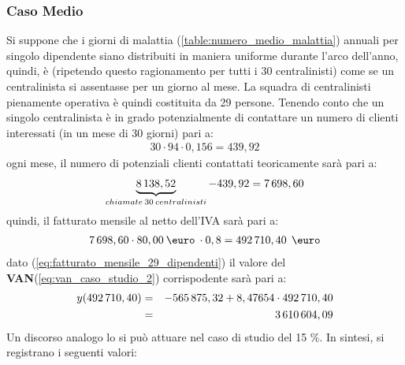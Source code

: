 \subsubsection[Caso Medio]{Caso Medio}
Si suppone che i giorni di malattia (\ref{table:numero_medio_malattia}) annuali per singolo dipendente siano distribuiti in maniera uniforme durante l'arco dell'anno, quindi, è (ripetendo questo ragionamento per tutti i 30 centralinisti) come se un centralinista si assentasse per un giorno al mese. \newline
La squadra di centralinisti pienamente operativa è quindi costituita da 29 persone. \newline
Tenendo conto che un singolo centralinista è in grado potenzialmente di contattare un numero di clienti interessati (in un mese di 30 giorni) pari a:
	\begin{equation}
	\label{eq:chiamate_1_dipendente}
	\begin{split}
		30 \cdot 94 \cdot 0,156 = 439,92
	\end{split}
	\end{equation}
ogni mese, il numero di potenziali clienti contattati teoricamente sarà pari a:
	\begin{equation}
	\label{eq:chiamate_29_dipendenti}
	\begin{split}
		\underbrace{8\thinspace 138,52}_{chiamate\: 30 \: centralinisti} - 439,92 = 7\thinspace 698,60
 	\end{split}
	\end{equation}
quindi, il fatturato mensile al netto dell'IVA sarà pari a:
	\begin{equation}
	\label{eq:fatturato_mensile_29_dipendenti}
	\begin{split}
		7\thinspace 698,60 \cdot 80,00 \:\mbox{\euro} \: \cdot 0,8 = 492\thinspace 710,40 \: \:\mbox{\euro}
 	\end{split}
	\end{equation}	
dato (\ref{eq:fatturato_mensile_29_dipendenti}) il valore del \textbf{\ac{VAN}}(\ref{eq:van_caso_studio_2}) corrispodente sarà pari a:
	\begin{eqnarray}
	\label{eq:van_fatturato_mensile_29_dipendenti}
		y(492\thinspace 710,40) & = & -565\thinspace 875,32 + 8,47654 \cdot 492\thinspace 710,40 \nonumber \\
								 & = & 3\thinspace 610\thinspace 604,09 
	\end{eqnarray}	
Un discorso analogo lo si può attuare nel caso di studio del 15 \%. \newline
In sintesi, si registrano i seguenti valori:
